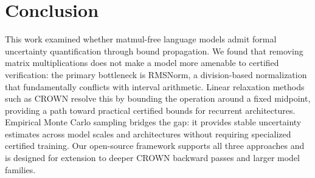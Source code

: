 \documentclass[11pt]{article}
\begin{document}
\section{Conclusion}

This work examined whether matmul-free language models admit formal uncertainty quantification through bound propagation. We found that removing matrix multiplications does not make a model more amenable to certified verification: the primary bottleneck is RMSNorm, a division-based normalization that fundamentally conflicts with interval arithmetic. Linear relaxation methods such as CROWN resolve this by bounding the operation around a fixed midpoint, providing a path toward practical certified bounds for recurrent architectures. Empirical Monte Carlo sampling bridges the gap: it provides stable uncertainty estimates across model scales and architectures without requiring specialized certified training. Our open-source framework supports all three approaches and is designed for extension to deeper CROWN backward passes and larger model families.



\end{document}

